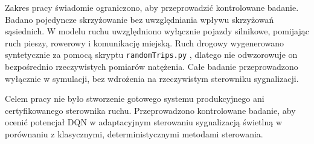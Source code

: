 Zakres pracy świadomie ograniczono, aby przeprowadzić kontrolowane badanie. Badano pojedyncze skrzyżowanie bez uwzględniania wpływu skrzyżowań sąsiednich. W modelu ruchu uwzględniono wyłącznie pojazdy silnikowe, pomijając ruch pieszy, rowerowy i komunikację miejską. Ruch drogowy wygenerowano syntetycznie za pomocą skryptu \texttt{randomTrips.py} \cite{sumo_randomtrips_docs}, dlatego nie odwzorowuje on bezpośrednio rzeczywistych pomiarów natężenia. Całe badanie przeprowadzono wyłącznie w symulacji, bez wdrożenia na rzeczywistym sterowniku sygnalizacji.

Celem pracy nie było stworzenie gotowego systemu produkcyjnego ani certyfikowanego sterownika ruchu. Przeprowadzono kontrolowane badanie, aby ocenić potencjał DQN w adaptacyjnym sterowaniu sygnalizacją świetlną w porównaniu z klasycznymi, deterministycznymi metodami sterowania.
